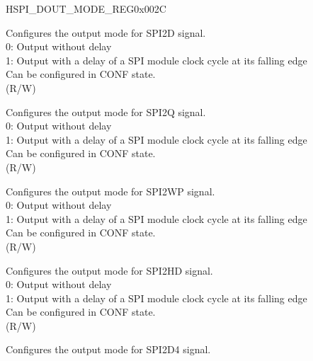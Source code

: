 \begin{register}{H}{SPI\_DOUT\_MODE\_REG}{0x002C}\label{regdesc:SPIDOUTMODEREG}
%
%
%
%
%
%
%
%
%
%
\regnewline%
\begin{regdesc}\begin{reglist}
\label{fielddesc:SPIDOUT0MODE}\item [SPI\_DOUT0\_MODE] Configures the output mode for SPI2D signal.\\
0: Output without delay\\
1: Output with a delay of a SPI module clock cycle at its falling edge\\
Can be configured in CONF state. \\
(R/W)
\label{fielddesc:SPIDOUT1MODE}\item [SPI\_DOUT1\_MODE] Configures the output mode for SPI2Q signal.\\
0: Output without delay\\
1: Output with a delay of a SPI module clock cycle at its falling edge\\
Can be configured in CONF state.\\
(R/W)
\label{fielddesc:SPIDOUT2MODE}\item [SPI\_DOUT2\_MODE] Configures the output mode for SPI2WP signal.\\
0: Output without delay\\
1: Output with a delay of a SPI module clock cycle at its falling edge\\
Can be configured in CONF state. \\
(R/W)
\label{fielddesc:SPIDOUT3MODE}\item [SPI\_DOUT3\_MODE] Configures the output mode for SPI2HD signal.\\
0: Output without delay\\
1: Output with a delay of a SPI module clock cycle at its falling edge\\
Can be configured in CONF state. \\
(R/W)
\label{fielddesc:SPIDOUT4MODE}\item [SPI\_DOUT4\_MODE] Configures the output mode for SPI2D4 signal.\\

\end{reglist}
\end{regdesc}
\end{register}
